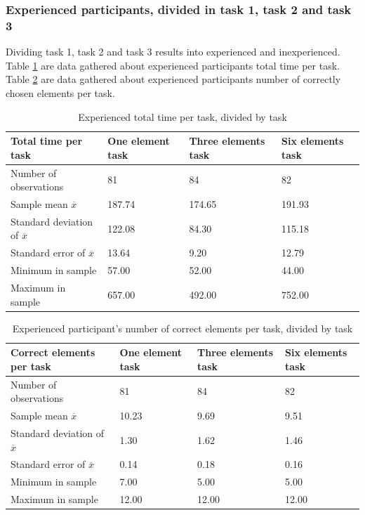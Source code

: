 \subsubsection{Experienced participants, divided in task 1, task 2 and task 3}\label{sec:taskdivided_experienced}

Dividing task 1, task 2 and task 3 results into experienced and inexperienced. Table \ref{tab:totaltime_tasks_experienced} are data gathered about experienced participants total time per task. Table \ref{tab:totalcorrect_tasks_experienced} are data gathered about experienced participants number of correctly chosen elements per task.

\begin{table}[H]
	\centering
	\begin{tabular}{l|l|l|l}
		Total time per task & One element task & Three elements task & Six elements task \\ \hline
		Number of observations & 81    & 84      & 82   \\
		Sample mean $\overline{x}$  & 187.74  &  174.65  &  191.93   \\
		Standard deviation of $\overline{x}$ & 122.08  & 84.30  & 115.18    \\
		Standard error of $\overline{x}$ & 13.64  & 9.20 & 12.79   \\
		Minimum in sample   & 57.00  & 52.00 &  44.00  \\
		Maximum in sample  & 657.00 & 492.00  & 752.00 \\ \hline
	\end{tabular}
	\caption[Total time, task and experienved divided]{Experienced total time per task, divided by task}
	\label{tab:totaltime_tasks_experienced}
\end{table}

\begin{table}[H]
	\centering
	\begin{tabular}{l|l|l|l}
		Correct elements per task & One element task & Three elements task & Six elements task \\ \hline
		Number of observations & 81    & 84      & 82   \\
		Sample mean $\overline{x}$ & 10.23  &  9.69  &  9.51   \\
		Standard deviation of $\overline{x}$ & 1.30  & 1.62  & 1.46   \\
		Standard error of $\overline{x}$ & 0.14  & 0.18  & 0.16   \\
		Minimum in sample & 7.00 & 5.00 &  5.00 \\
		Maximum in sample  & 12.00 & 12.00  & 12.00 \\ \hline
	\end{tabular}
	\caption[Correct elements, task and experienved divided]{Experienced participant's number of correct elements per task, divided by task}
	\label{tab:totalcorrect_tasks_experienced}
\end{table}

